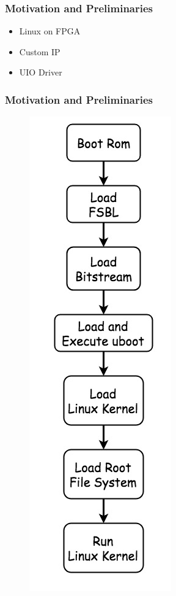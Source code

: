 \documentclass{beamer}
\begin{document}
\begin{frame}
\frametitle{\textcolor[rgb]{0.5,0.5,0.3}{Motivation} and Preliminaries}
\begin{itemize}
\item \alert{Linux on FPGA}
\item Custom IP
\item UIO Driver
\end{itemize}
\end{frame}

\begin{frame}
\frametitle{\textcolor[rgb]{0.5,0.5,0.3}{Motivation} and Preliminaries}
\begin{figure}
\centering\includegraphics[scale=0.25]{image/linux_boot_stage.jpg}
\end{figure}
\end{frame}
\end{document}
